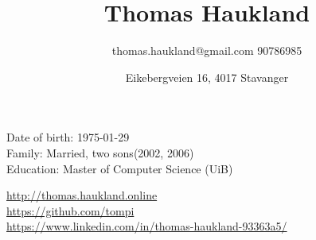 \documentclass[10pt]{article}
\title{\bfseries\Huge Thomas Haukland}
\author{thomas.haukland@gmail.com 90786985}
\author{Eikebergveien 16, 4017 Stavanger}
\date{}
\begin{document}
\maketitle
\vspace{1em}
\begin{minipage}[ht]{0.48\textwidth}
Date of birth: 1975-01-29\\
Family: Married, two sons(2002, 2006)\\
Education: Master of Computer Science (UiB)\\
\end{minipage}
\begin{minipage}[ht]{0.48\textwidth}
\url{http://thomas.haukland.online}\\
\url{https://github.com/tompi}\\
\url{https://www.linkedin.com/in/thomas-haukland-93363a5/}\\
\end{minipage}
\vspace{20pt}
 
\end{document}
